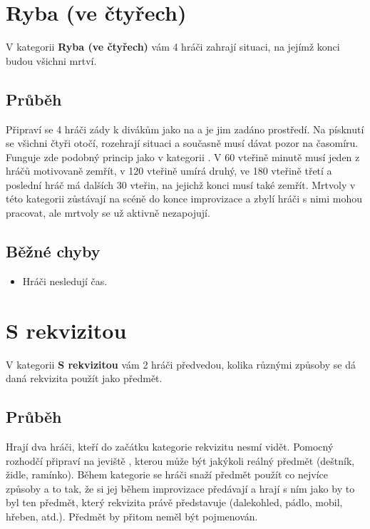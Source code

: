  
 
 
 
 
\needspace{5cm} \section{Ryba (ve čtyřech)} \label{ryba (ve čtyřech)}  
 
 
V kategorii \textbf{Ryba (ve čtyřech)}{} vám 4 hráči zahrají situaci, na jejímž konci budou všichni mrtví. 
 
\subsection{Průběh} Připraví se 4 hráči zády k divákům jako na  a je jim zadáno prostředí. Na písknutí  se všichni čtyři otočí, rozehrají situaci a současně musí dávat pozor na časomíru. Funguje zde podobný princip jako v kategorii . V 60 vteřině minutě musí jeden z hráčů motivovaně zemřít, v 120 vteřině umírá druhý, ve 180 vteřině třetí a poslední hráč má dalších 30 vteřin, na jejichž konci musí také zemřít. Mrtvoly v této kategorii zůstávají na scéně do konce improvizace a zbylí hráči s nimi mohou pracovat, ale mrtvoly se už aktivně nezapojují. 
 
\subsection{ Běžné chyby } \begin{itemize}
\item Hráči nesledují čas.
\end{itemize}
 
 
 
 
\needspace{5cm} \section{S rekvizitou} \label{s rekvizitou}  
 
V kategorii \textbf{S rekvizitou}{} vám 2 hráči předvedou, kolika různými způsoby se dá daná rekvizita použít jako předmět. 
 
\subsection{Průběh} Hrají dva hráči, kteří do začátku kategorie rekvizitu nesmí vidět. Pomocný rozhodčí připraví na jeviště , kterou může být jakýkoli reálný předmět (deštník, židle, ramínko). Během kategorie se hráči snaží předmět použít co nejvíce způsoby a to tak, že si jej během improvizace předávají a hrají s ním jako by to byl ten předmět, který rekvizita právě představuje (dalekohled, pádlo, mobil, hřeben, atd.).  Předmět by přitom neměl být pojmenován. 
 
